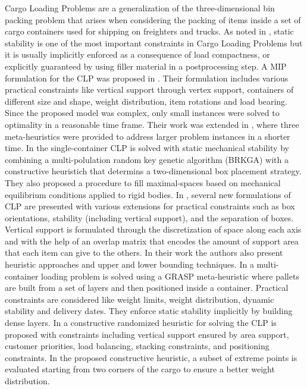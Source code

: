 Cargo Loading Problems are a generalization of the three-dimensional bin packing problem that arises when considering the packing of items inside a set of cargo containers used for shipping on freighters and trucks.
As noted in \cite{BORTFELDT20131}, static stability is one of the most important constraints in Cargo Loading Problems but it is usually implicitly enforced as a consequence of load compactness, or explicitly guaranteed by using filler material in a postprocessing step.
A MIP formulation for the CLP was proposed in \cite{paquay2016mixed}. Their formulation includes various practical constraints like vertical support through vertex support, containers of different size and shape, weight distribution, item rotations and load bearing.
Since the proposed model was complex, only small instances were solved to optimality in a reasonable time frame. Their work was extended in \cite{paquay2007}, where three meta-heuristics were provided to address larger problem instances in a shorter time.
In \cite{GALRAORAMOS2016565} the single-container CLP is solved with static mechanical stability by combining a multi-polulation random key genetic algorithm (BRKGA) with a constructive heuristich that determins a two-dimensional box placement strategy.
They also proposed a procedure to fill maximal-spaces based on mechanical equilibrium conditions applied to rigid bodies.
In \cite{kurpel2020exact}, several new formulations of CLP are presented with various extensions for practical constraints such as box orientations, stability (including vertical support), and the separation of boxes.
Vertical support is formulated through the discretization of space along each axis and with the help of an overlap matrix that encodes the amount of support area that each item can give to the others.
In their work the authors also present heuristic approaches and upper and lower bounding techniques.
In \cite{Alonso2020} a multi-container loading problem is solved using a GRASP meta-heuristic where pallets are built from a set of layers and then positioned inside a container. 
Practical constraints are considered like weight limits, weight distribution, dynamic stability and delivery dates. They enforce static stability implicitly by building dense layers.
In \cite{GAJDA2022102559} a constructive randomized heuristic for solving the CLP is proposed with constraints including vertical support ensured by area support, customer priorities, load balancing, stacking constraints, and positioning constraints.
In the proposed constructive heuristic, a subset of extreme points is evaluated starting from two corners of the cargo to ensure a better weight distribution.

